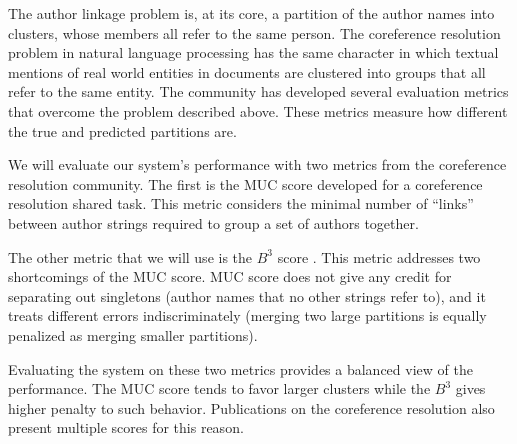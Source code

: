 \documentclass[twocolumn]{article}
\begin{document}
The author linkage problem is, at its core, a partition of the author
names into clusters, whose members all refer to the same person.  The
coreference resolution problem in natural language processing has the
same character in which textual mentions of real world entities in
documents are clustered into groups that all refer to the same entity.
The community has developed several evaluation metrics that overcome
the problem described above.  These metrics measure how different the
true and predicted partitions are.

We will evaluate our system's performance with two metrics from the
coreference resolution community.  The first is the MUC score
\cite{Vilain95} developed for a coreference resolution shared task.
This metric considers the minimal number of ``links'' between author
strings required to group a set of authors together.

The other metric that we will use is the $B^3$ score \cite{Bagga98b}.
This metric addresses two shortcomings of the MUC score.  MUC score
does not give any credit for separating out singletons (author names
that no other strings refer to), and it treats different errors
indiscriminately (merging two large partitions is equally penalized as
merging smaller partitions).

Evaluating the system on these two metrics provides a balanced view of
the performance.  The MUC score tends to favor larger clusters while
the $B^3$ gives higher penalty to such behavior.  Publications on the
coreference resolution also present multiple scores for this reason.



\end{document}
